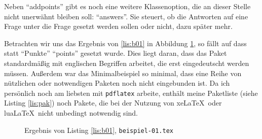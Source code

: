 Neben \enquote{addpoints} gibt es noch eine weitere Klassenoption, die an dieser Stelle nicht unerwähnt bleiben soll: \enquote{answers}. Sie steuert, ob die Antworten auf eine Frage unter die Frage gesetzt werden sollen oder nicht, dazu später mehr.

Betrachten wir uns das Ergebnis von \ref{lis:b01} in Abbildung \ref{fig:b01}, so fällt auf dass statt \enquote{Punkte} \enquote{points} gesetzt wurde. 
Dies liegt daran, dass das Paket standardmäßig mit englischen Begriffen arbeitet, die erst eingedeutscht werden müssen. Außerdem war das Minimalbeispiel so minimal, dass eine Reihe von nützlichen oder notwendigen Paketen noch nicht eingebunden ist. 
Da ich persönlich noch am liebsten mit \texttt{pdflatex} arbeite, enthält meine Paketliste (siehe Listing \ref{lis:pak}) noch Pakete, die bei der Nutzung von xe\LaTeX\ oder lua\LaTeX\ nicht unbedingt notwendig sind.

\begin{figure}
\caption{Ergebnis von Listing \ref{lis:b01}, \texttt{beispiel-01.tex}}\label{fig:b01}
\end{figure}



